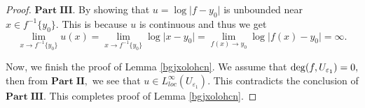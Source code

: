 \documentclass[11pt,twoside]{article}
\theoremstyle{definition}
\theoremstyle{remark}
\begin{document}
\begin{proof}
 
$\mathbf{Part}\;\mathbf{III}.$ By showing that $u=\log\vert f-y_{0}\vert$ is unbounded near $x\in f^{-1}\{y_{0}\}.$ This is because $u$ is continuous and thus we get 
$$\lim_{x\rightarrow f^{-1}\{y_{0}\}}u(x)=\lim_{x\rightarrow f^{-1}\{y_{0}\}}\log\vert x-y_{0}\vert=\lim_{f(x)\rightarrow y_{0}}\log\vert f(x)-y_{0}\vert=\infty.$$


Now, we finish the proof of Lemma \ref{bgjxolohcn}.   We assume that  ${\rm deg}(f,U_{\varepsilon_{1}})=0,$ then  from $\mathbf{Part}\;\mathbf{II},$ we see that $u\in L_{loc}^{\infty}(U_{\varepsilon_{1}}).$
This contradicts the conclusion of  $\mathbf{Part}\;\mathbf{III}.$ This completes proof of Lemma \ref{bgjxolohcn}. 
\end{proof}
\end{document}
